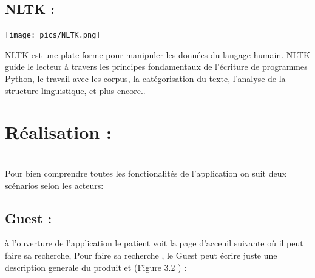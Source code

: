 \subsection{NLTK :}
\begin{center}
\texttt{[image: pics/NLTK.png]}    
\end{center}

NLTK est une plate-forme pour manipuler les données du langage humain. NLTK guide le lecteur à travers les principes fondamentaux de l’écriture de programmes Python, le travail avec les corpus, la catégorisation du texte, l’analyse de la structure linguistique, et plus encore..\\

\pagebreak
\section{Réalisation : }
\\
Pour bien comprendre toutes les fonctionalités de l'application on suit deux scénarios selon les acteurs: \\
\subsection{Guest :}
à l'ouverture de l'application le patient voit  la page d'acceuil suivante  où il peut faire sa recherche, Pour faire sa recherche , le Guest peut écrire juste une description generale du produit et (Figure 3.2 ) :\\

